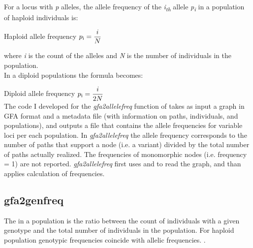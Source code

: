 For a locus with \emph{p} alleles, the allele frequency of the \emph{i\textsubscript{th}} allele \emph{p\textsubscript{i}} in a population of haploid individuals is: 

Haploid allele frequency    $p\textsubscript{i} = \dfrac{i}{N}$

\noindent
where \emph{i} is the count of the alleles and \emph{N} is the number of individuals in the population.\\
\noindent
In a diploid populations the formula becomes: 

Diploid allele frequency  $p\textsubscript{i} =  \dfrac{i}{2N}$\\

The code I developed for the \textit{gfa2allelefreq} function of \vgp takes as input a graph in GFA format and a metadata file (with information on paths, individuals, and populations), and outputs a file that contains the allele frequencies for variable loci per each population. In \textit{gfa2allelefreq} the allele frequency corresponds to the number of paths that support a node (i.e. a variant) divided by the total number of paths actually realized. The frequencies of monomorphic nodes (i.e. frequency = 1) are not reported.  %
\textit{gfa2allelefreq} first uses \bbp and \bbc to read the graph, and than applies calculation of frequencies.


 

\subsection{gfa2genfreq}

The  in a population is the ratio between the count of individuals with a given genotype and the total number of individuals in the population. For haploid population genotypic frequencies coincide with allelic frequencies.  \cite{brooker2014principles}.

